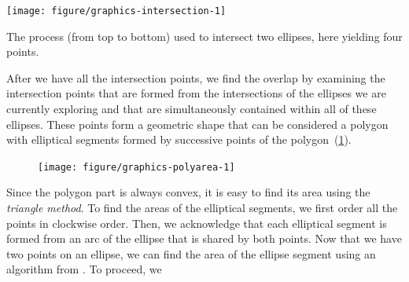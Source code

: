 \documentclass[
  oneside,
  usegeometry,
  numbers=noendperiod,
  openany,
  parskip=half
]{scrbook}\usepackage[]{graphicx}\usepackage{xcolor}
\newenvironment{knitrout}{}{} %
\begin{document}
\begin{marginfigure}
\begin{knitrout}
\color{fgcolor}

{\centering \texttt{[image: figure/graphics-intersection-1]} 

}



\end{knitrout}
\caption{The process (from top to bottom) used to intersect two ellipses, here yielding four points.}
\label{fig:intersection}
\end{marginfigure}

After we have all the intersection points, we find the overlap by examining the intersection points that are formed from the intersections of the ellipses we are currently exploring and that are simultaneously contained within all of these ellipses. These points form a geometric shape that can be considered a polygon with elliptical segments formed by successive points of the polygon~(\cref{fig:polyarea}).

\begin{figure}[hbt]
\begin{knitrout}
\color{fgcolor}

{\centering \texttt{[image: figure/graphics-polyarea-1]} 

}



\end{knitrout}
\label{fig:polyarea}
\end{figure}

Since the polygon part is always convex, it is easy to find its area using the \emph{triangle method}. To find the areas of the elliptical segments, we first order all the points in clockwise order. Then, we acknowledge that each elliptical segment is formed from an arc of the ellipse that is shared by both points. Now that we have two points on an ellipse, we can find the area of the ellipse segment using an algorithm from \citet{eberly_area_2016}. To proceed, we
\end{document}
